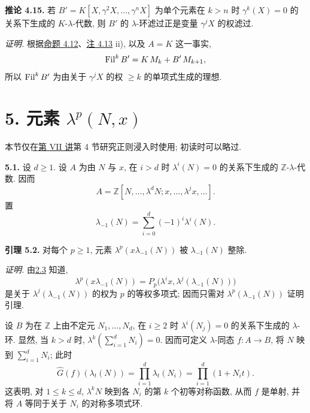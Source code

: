 \textbf{推论 4.15.} 若 \(B'=K[X,\gamma^2X,\ldots,\gamma^nX]\) 为单个元素在 \(k>n\) 时 \(\gamma^k(X)=0\) 的关系下生成的 \(K\)-\(\lambda\)-代数, 则 \(B'\) 的 \(\lambda\)-环滤过正是变量 \(\gamma^jX\) 的权滤过.

\emph{证明.} 根据\hyperlink{sga6.e05.prop.4-12}{命题 4.12}、\hyperlink{sga6.e05.rem.4-13}{注 4.13} ii), 以及 \(A=K\) 这一事实,
\[
 \operatorname{Fil}^kB'=K\,M_k+B'\,M_{k+1},
\]
所以 \(\operatorname{Fil}^kB'\) 为由关于 \(\gamma^jX\) 的权 \(\ge k\) 的单项式生成的理想.

\section*{5. 元素 \(\lambda^p(N,x)\)}

本节仅在\hyperlink{sga6.e07.expose}{第 VII 讲}第 4 节研究正则浸入时使用; 初读时可以略过.

\textbf{5.1.} 设 \(d\ge1\). 设 \(A\) 为由 \(N\) 与 \(x\), 在 \(i>d\) 时 \(\lambda^i(N)=0\) 的关系下生成的 \(\mathbb Z\)-\(\lambda\)-代数. 因而
\[
  A=\mathbb Z[N,\ldots,\lambda^dN;
       x,\ldots,\lambda^jx,\ldots].
\]
置
\begin{equation}\tag{5.1.1}
  \lambda_{-1}(N)=\sum_{i=0}^{d}(-1)^i\lambda^i(N).
\end{equation}

\textbf{引理 5.2.} 对每个 \(p\ge1\), 元素 \(\lambda^p(x\lambda_{-1}(N))\) 被 \(\lambda_{-1}(N)\) 整除.

\emph{证明.} 由\hyperlink{sga6.e05.eq.2-3-1}{2.3} 知道,
\[
 \lambda^p(x\lambda_{-1}(N))
 =P_p\bigl(\lambda^ix,\lambda^j(\lambda_{-1}(N))\bigr)
\]
是关于 \(\lambda^j(\lambda_{-1}(N))\) 的权为 \(p\) 的等权多项式; 因而只需对 \(\lambda^p(\lambda_{-1}(N))\) 证明引理.

设 \(B\) 为在 \(\mathbb Z\) 上由不定元 \(N_1,\ldots,N_d\), 在 \(i\ge2\) 时 \(\lambda^i(N_j)=0\) 的关系下生成的 \(\lambda\)-环. 显然, 当 \(k>d\) 时, \(\lambda^k(\sum_{i=1}^dN_i)=0\). 因而可定义 \(\lambda\)-同态 \(f:A\to B\), 将 \(N\) 映到 \(\sum_{i=1}^dN_i\); 此时
\[
 \widehat G(f)(\lambda_t(N))
 =\prod_{i=1}^d\lambda_t(N_i)
 =\prod_{i=1}^d(1+N_it).
\]
这表明, 对 \(1\le k\le d\), \(\lambda^kN\) 映到各 \(N_i\) 的第 \(k\) 个初等对称函数, 从而 \(f\) 是单射, 并将 \(A\) 等同于关于 \(N_i\) 的对称多项式环.


